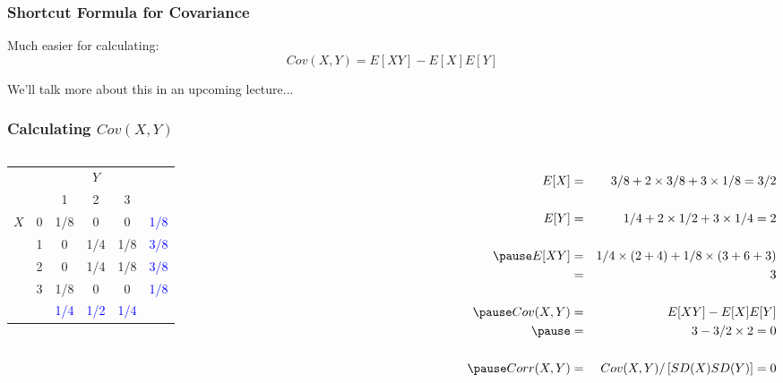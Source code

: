 \documentclass[handout]{beamer}
\begin{document}
\begin{frame}
\frametitle{Shortcut Formula for Covariance}

Much easier for calculating:
 $$\boxed{Cov(X,Y) = E[XY] - E[X]E[Y]}$$


\vspace{2em}
\hfill{We'll talk more about this in an upcoming lecture...}
\end{frame}
\begin{frame}
\frametitle{Calculating $Cov(X,Y)$}

\begin{columns}

\begin{table}
\footnotesize
\begin{tabular}{|cc|ccc|c|}
\hline
&&\multicolumn{3}{c|}{$Y$}&\\
&&1 & 2&3&\\
\hline
\multirow{4}{*}{$X$}
&0& \multicolumn{1}{|c}{\alert{1/8}} & \alert{0}& \alert{0}&\textcolor{blue}{1/8}\\
&1& \multicolumn{1}{|c}{\alert{0}} & \alert{1/4}&\alert{1/8}&\textcolor{blue}{3/8}\\
&2& \multicolumn{1}{|c}{\alert{0}} & \alert{1/4}&\alert{1/8}&\textcolor{blue}{3/8}\\
&3& \multicolumn{1}{|c}{\alert{1/8}} & \alert{0}&\alert{0}&\textcolor{blue}{1/8}\\
\hline
&&\textcolor{blue}{1/4}&\textcolor{blue}{1/2}&\textcolor{blue}{1/4}&\\
\hline
\end{tabular}
\vspace{6em}
\end{table}


\footnotesize
\begin{eqnarray*}
	E[X] &=&3/8 + 2 \times 3/8 + 3 \times 1/8 = 3/2\\\\ 
	E[Y] &=&1/4 + 2 \times 1/2 + 3 \times 1/4 = 2 \\ \\ \pause
	E[XY] &=& 1/4\times ( 2 + 4) + 1/8 \times (3 + 6 + 3)\\ 
		&=& 3\\ \\ \pause
	Cov(X,Y) &=& E[XY] - E[X]E[Y]\\ \pause
			&=& 3 - 3/2\times 2 = 0\\\\ \pause
	Corr(X,Y) &=& Cov(X,Y)/\left[SD(X) SD(Y) \right] = 0
\end{eqnarray*}

\end{columns}

\end{frame}
\end{document}
